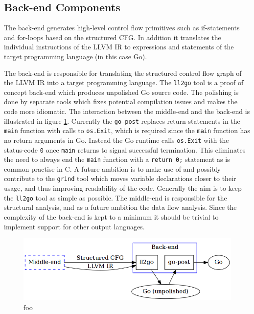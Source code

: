 
\subsection{Back-end Components}


The back-end generates high-level control flow primitives such as if-statements and for-loops based on the structured CFG. In addition it translates the individual instructions of the LLVM IR to expressions and statements of the target programming language (in this case Go).

The back-end is responsible for translating the structured control flow graph of the LLVM IR into a target programming language. The \texttt{ll2go} tool is a proof of concept back-end which produces unpolished Go source code. The polishing is done by separate tools which fixes potential compilation issues and makes the code more idiomatic. The interaction between the middle-end and the back-end is illustrated in figure \ref{fig:back-end}. Currently the \texttt{go-post} replaces return-statements in the \texttt{main} function with calls to \texttt{os.Exit}, which is required since the \texttt{main} function has no return arguments in Go. Instead the Go runtime calls \texttt{os.Exit} with the status-code \texttt{0} once \texttt{main} returns to signal successful termination. This eliminates the need to always end the \texttt{main} function with a \texttt{return 0;} statement as is common practise in C. A future ambition is to make use of and possibly contribute to the \texttt{grind} tool which moves variable declarations closer to their usage, and thus improving readability of the code. Generally the aim is to keep the \texttt{ll2go} tool as simple as possible. The middle-end is responsible for the structural analysis, and as a future ambition the data flow analysis. Since the complexity of the back-end is kept to a minimum it should be trivial to implement support for other output languages.

\begin{figure}[htbp]
	\begin{center}
		\includegraphics[width=\textwidth]{inc/back-end.png}
		\caption{foo}
		\label{fig:back-end}
	\end{center}
\end{figure}


